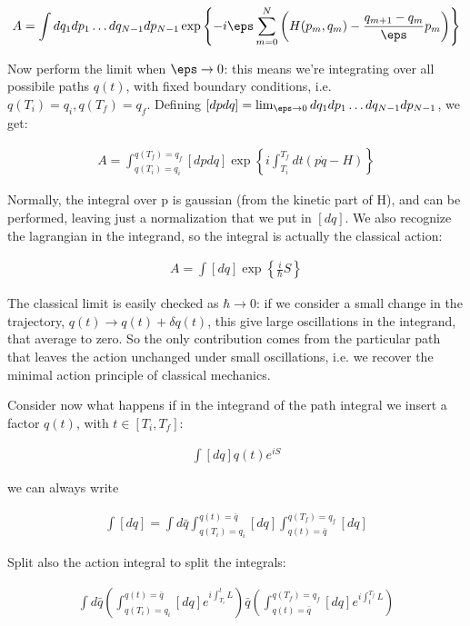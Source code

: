 \documentclass{report}
\begin{document}
\begin{align}
    A = \int dq_1 dp_1\ldots dq_{N-1}dp_{N-1} \exp\left\{-i\eps\sum_{m=0}^N\left(H(p_m, q_m) - \frac{q_{m+1}-q_m}{\eps}p_m\right)\right\}
\end{align}

Now perform the limit when \(\eps \rightarrow 0\): this means we're integrating over all possibile paths \(q(t)\), with fixed boundary conditions, i.e. \(q(T_i) = q_i, q(T_f) = q_f\). Defining \([dpdq] = \lim_{\eps \rightarrow 0}dq_1dp_1 \ldots dq_{N-1}dp_{N-1}\), we get: 

\begin{align}
    A = \int_{q(T_i) = q_i}^{q(T_f) = q_f} [dpdq] \exp\left\{i\int_{T_i}^{T_f} dt (p\dot{q} - H) \right\}
\end{align}

Normally, the integral over p is gaussian (from the kinetic part of H), and can be performed, leaving just a normalization that we put in \([dq]\). We also recognize the lagrangian in the integrand, so the integral is actually the classical action: 

\begin{align}
    A = \int [dq]\exp\left\{\frac{i}{\hbar}S \right\}
\end{align}

The classical limit is easily checked as \(\hbar \rightarrow 0\): if we consider a small change in the trajectory, \(q(t)\rightarrow q(t) +\delta q(t)\), this give large oscillations in the integrand, that average to zero. So the only contribution comes from the particular path that leaves the action unchanged under small oscillations, i.e. we recover the minimal action principle of classical mechanics.  

Consider now what happens if in the integrand of the path integral we insert a factor \(q(t)\), with \(t \in [T_i, T_f]\): 


\begin{align}
    \int [dq]q(t)e^{iS}
\end{align}

we can always write 

\begin{align}
    \int [dq]= \int d\bar{q} \int_{q(T_i) = q_i}^{q(t) = \bar{q}} [dq] \int_{q(t) = \bar{q}}^{q(T_f) = q_f} [dq]
\end{align}

Split also the action integral to split the integrals: 

\begin{align}
    \int d\bar{q} \left(\int_{q(T_i) = q_i}^{q(t) = \bar{q}} [dq] e^{i\int_{T_i}^t L}\right)\bar{q}\left(\int_{q(t) = \bar{q}}^{q(T_f) = q_f} [dq] e^{i\int_{t}^{T_f} L}\right)
\end{align}
\end{document}
